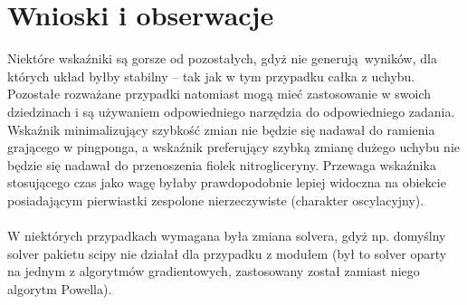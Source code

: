 \documentclass[a4paper, 10pt]{article}
\begin{document}
	\section{Wnioski i obserwacje}
		Niektóre wskaźniki są gorsze od pozostałych, gdyż nie generują wyników, dla których układ byłby stabilny -- tak jak w tym przypadku całka z uchybu. Pozostałe rozważane przypadki natomiast mogą mieć zastosowanie w swoich dziedzinach i są używaniem odpowiedniego narzędzia do odpowiedniego zadania. Wskaźnik minimalizujący szybkość zmian nie będzie się nadawał do ramienia grającego w pingponga, a wskaźnik preferujący szybką zmianę dużego uchybu nie będzie się nadawał do przenoszenia fiolek nitrogliceryny. Przewaga wskaźnika stosującego czas jako wagę byłaby prawdopodobnie lepiej widoczna na obiekcie posiadającym pierwiastki zespolone nierzeczywiste (charakter oscylacyjny).
		\\ \\
		W niektórych przypadkach wymagana była zmiana solvera, gdyż np. domyślny solver pakietu scipy nie działał dla przypadku z modułem (był to solver oparty na jednym z algorytmów gradientowych, zastosowany został zamiast niego algorytm Powella).
\end{document}
